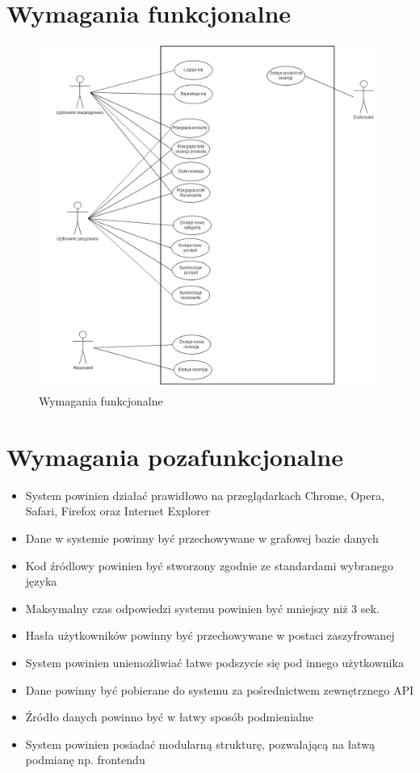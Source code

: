 \section{Wymagania funkcjonalne}
\begin{figure}[h!]
	\centering
	\includegraphics[scale=0.4]{images/funkcjonalne.png}
	\caption{Wymagania funkcjonalne}
\end{figure}

\section{Wymagania pozafunkcjonalne}
\begin{itemize}
\item System powinien działać prawidłowo na przeglądarkach Chrome, Opera, Safari, Firefox oraz Internet Explorer
\item Dane w systemie powinny być przechowywane w grafowej bazie danych
\item Kod źródlowy powinien być stworzony zgodnie ze standardami wybranego języka
\item Maksymalny czas odpowiedzi systemu powinien być mniejszy niż 3 sek.
\item Hasła użytkowników powinny być przechowywane w postaci zaszyfrowanej
\item System powinien uniemożliwiać łatwe podszycie się pod innego użytkownika 
\item Dane powinny być pobierane do systemu za pośrednictwem zewnętrznego API
\item Źródło danych powinno być w łatwy sposób podmienialne
\item System powinien posiadać modularną strukturę, pozwalającą na łatwą podmianę np. frontendu
\end{itemize}

